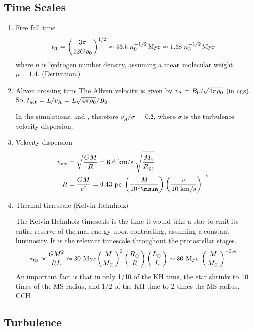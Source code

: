 \subsection{Time Scales}
\label{sec:orgdbd3a0c}
\begin{enumerate}
\item Free fall time
\label{sec:org612770d}
$$
t_{{\rm ff}}=\left(\frac{3\pi}{32G\rho_{0}}\right)^{1/2} \approx 43.5
\; n_0^{-1/2} \, {\rm Myr} \approx 1.38 \; n_3^{-1/2} \, {\rm Myr}
$$
where \(n\) is hydrogen number density, assuming a mean molecular weight \(\mu = 1.4\). (\href{file:///Users/chongchonghe/Dropbox/Notability-more/science/Free-fall time.pdf}{Derivation}.)

\item Alfven crossing time
\label{sec:org23d9859}
The Alfven velocity is given by \(v_{{\rm A}}=B_{0}/\sqrt{4\pi\rho_{0}}\) (in cgs). So, \(t_{{\rm act}}=L/v_{{\rm A}}=L\sqrt{4\pi\rho_{0}}/B_{0}\).

In the simulations, and , therefore \(v_A / \sigma\) = 0.2, where \(\sigma\) is the turbulence velocity dispersion.

\item Velocity dispersion
\label{sec:orgfc88e0b}
\begin{align}
v_{\rm vir} &= \sqrt{\frac{GM}{R}} = 6.6~{\rm km/s} \; \sqrt{\frac{M_4}{R_{\rm pc}}} \\
R &= \frac{GM}{v^{2}} = 0.43~{\rm pc} \; \left( \frac{M}{10^{4} \msun} \right) \left( \frac{v}{10~{\rm km/s}} \right)^{-2}
\end{align}

\item Thermal timescale (Kelvin-Helmholz)
\label{sec:org8b1e0c7}

The Kelvin-Helmholz timescale is the time it would take a star to emit its entire reserve of thermal energy upon contracting, assuming a constant luminosity. It is the relevant timescale throughout the protostellar stages.
$$
\tau_{\rm th} \approx \frac{GM^2}{RL} \approx 30~{\rm Myr} \left( \frac{M}{M_{\odot}} \right)^2 \left( \frac{R_{\odot}}{R} \right) \left( \frac{L_{\odot}}{L} \right) \sim 30~{\rm Myr} \ \left( \frac{M}{M_{\odot}} \right)^{-2.4}
$$
An important fact is that in only 1/10 of the KH time, the star shrinks to 10 times of the MS radius, and 1/2 of the KH time to 2 times the MS radius. -- CCH
\end{enumerate}

\subsection{Turbulence}
\label{sec:sf:turbulence}

